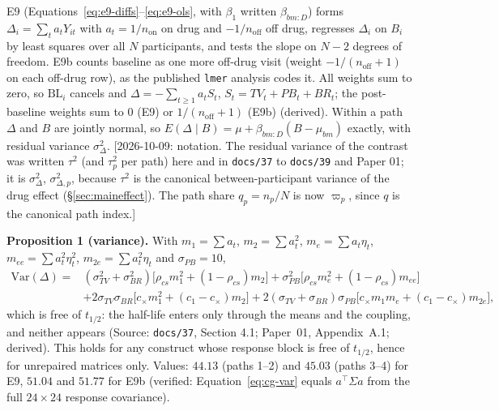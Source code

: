 \documentclass[11pt]{article}
\newcommand{\note}[1]{\textcolor{blue!60!black}{\small [#1]}}
\newcommand{\code}[1]{\texttt{#1}}
\begin{document}
E9 (Equations~\eqref{eq:e9-diffs}--\eqref{eq:e9-ols}, with $\beta_1$
written $\beta_{bm:D}$) forms
$\Delta_i = \sum_t a_t Y_{it}$ with $a_t = 1/n_{\mathrm{on}}$ on drug
and $-1/n_{\mathrm{off}}$ off drug, regresses $\Delta_i$ on $B_i$ by
least squares over all $N$ participants, and tests the slope on $N-2$
degrees of freedom. E9b counts baseline as one more off-drug visit
(weight $-1/(n_{\mathrm{off}}+1)$ on each off-drug row), as the
published \code{lmer} analysis codes it. All weights sum to zero, so
$\mathrm{BL}_i$ cancels and $\Delta = -\sum_{t\ge1} a_t S_t$,
$S_t = TV_t + PB_t + BR_t$; the post-baseline weights sum to $0$ (E9)
or $1/(n_{\mathrm{off}}+1)$ (E9b) (derived). Within a path $\Delta$
and $B$ are jointly normal, so
$E(\Delta \mid B) = \mu + \beta_{bm:D}(B - \mu_{bm})$ exactly, with
residual variance $\sigma_\Delta^2$. \note{2026-10-09: notation. The
residual variance of the contrast was written $\tau^2$ (and $\tau_p^2$
per path) here and in \code{docs/37} to \code{docs/39} and Paper 01;
it is $\sigma_\Delta^2$, $\sigma_{\Delta,p}^2$, because $\tau^2$ is the
canonical between-participant variance of the drug effect
(\S\ref{sec:maineffect}). The path share $q_p = n_p/N$ is now
$\varpi_p$, since $q$ is the canonical path index.}

\textbf{Proposition 1 (variance).} With $m_1 = \sum a_t$,
$m_2 = \sum a_t^2$, $m_e = \sum a_t\eta_t$,
$m_{ee} = \sum a_t^2\eta_t^2$, $m_{2e} = \sum a_t^2\eta_t$ and
$\sigma_{PB} = 10$,
\begin{equation}
\begin{aligned}
\mathrm{Var}(\Delta) = {} & (\sigma_{TV}^2 + \sigma_{BR}^2)
  \big[\rho_{cs} m_1^2 + (1-\rho_{cs}) m_2\big]
  + \sigma_{PB}^2\big[\rho_{cs} m_e^2 + (1-\rho_{cs}) m_{ee}\big] \\
& + 2\sigma_{TV}\sigma_{BR}\big[c_\times m_1^2 + (c_1 - c_\times) m_2\big]
  + 2(\sigma_{TV} + \sigma_{BR})\sigma_{PB}
  \big[c_\times m_1 m_e + (c_1 - c_\times) m_{2e}\big],
\end{aligned}
\label{eq:cg-var}
\end{equation}
which is free of $t_{1/2}$: the half-life enters only through the
means and the coupling, and neither appears (Source: \code{docs/37},
Section 4.1; Paper~01, Appendix~A.1; derived). This holds for any
construct whose response block is free of $t_{1/2}$, hence for
unrepaired matrices only. Values: $44.13$ (paths 1--2) and $45.03$
(paths 3--4) for E9, $51.04$ and $51.77$ for E9b (verified:
Equation~\eqref{eq:cg-var} equals $a^\top\Sigma a$ from the full
$24\times24$ response covariance).
\end{document}
